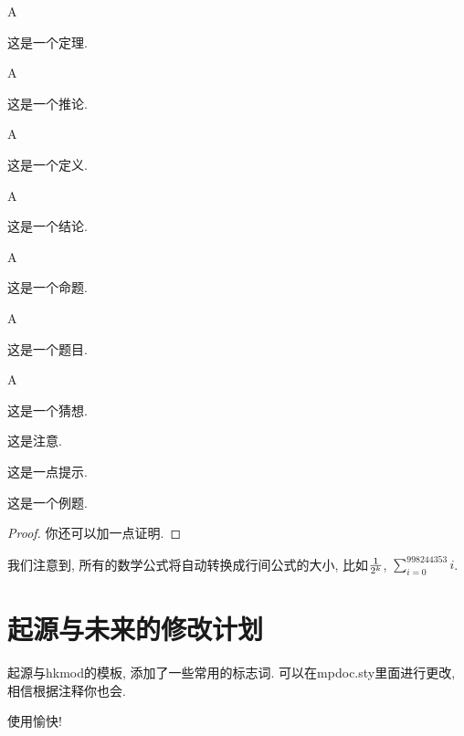 \documentclass[a4,10pt]{ctexart}
\begin{document}
\begin{dl}{A}{}
        
这是一个定理.
    
\end{dl}
    
\begin{tl}{A}{}
        
这是一个推论.
    
\end{tl}

\begin{dy}{A}{}
        
这是一个定义.
    
\end{dy}

\begin{jl}{A}{}
        
这是一个结论.
    
\end{jl}

\begin{mt}{A}{}
        
这是一个命题.
    
\end{mt}

\begin{ti}{A}{}
        
这是一个题目.
    
\end{ti}

\begin{cx}{A}{}
        
这是一个猜想.
    
\end{cx}

\begin{zy}
        
这是注意.
    
\end{zy}

\begin{ts}
        
这是一点提示.
    
\end{ts}

\begin{lt}
        
这是一个例题.
    
\end{lt}

\begin{proof}
你还可以加一点证明. 
\end{proof}

我们注意到, 所有的数学公式将自动转换成行间公式的大小, 比如${1\over 2^k}$, $\sum_{i=0}^{998244353}i$. 

\section{起源与未来的修改计划}

起源与hkmod的模板, 添加了一些常用的标志词. 可以在mpdoc.sty里面进行更改, 相信根据注释你也会. 

使用愉快! 
    
    
    
    
   
\end{document}

